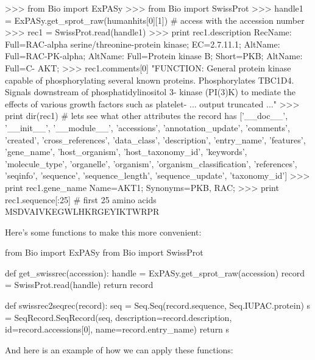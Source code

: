 \begin{python}
>>> from Bio import ExPASy
>>> from Bio import SwissProt
>>> handle1 = ExPASy.get_sprot_raw(humanhits[0][1]) # access with the accession number
>>> rec1 = SwissProt.read(handle1)
>>> print rec1.description
RecName: Full=RAC-alpha serine/threonine-protein kinase; EC=2.7.11.1; AltName: 
Full=RAC-PK-alpha; AltName: Full=Protein kinase B; Short=PKB; AltName: Full=C-
AKT;
>>> rec1.comments[0]
"FUNCTION: General protein kinase capable of phosphorylating several known 
proteins. Phosphorylates TBC1D4. Signals downstream of phosphatidylinositol 3-
kinase (PI(3)K) to mediate the effects of various growth factors such as platelet-
... output truncated ..."
>>> print dir(rec1) # lets see what other attributes the record has
['__doc__', '__init__', '__module__', 'accessions', 'annotation_update', 'comments', 'created', 'cross_references', 'data_class', 'description', 'entry_name', 'features', 'gene_name', 'host_organism', 'host_taxonomy_id', 'keywords', 'molecule_type', 'organelle', 'organism', 'organism_classification', 'references', 'seqinfo', 'sequence', 'sequence_length', 'sequence_update', 'taxonomy_id']
>>> print rec1.gene_name
Name=AKT1; Synonyms=PKB, RAC;
>>> print rec1.sequence[:25] # first 25 amino acids
MSDVAIVKEGWLHKRGEYIKTWRPR
\end{python}

Here's some functions to make this more convenient:

\begin{python}
from Bio import ExPASy
from Bio import SwissProt

def get_swissrec(accession):
    handle = ExPASy.get_sprot_raw(accession)
    record = SwissProt.read(handle)
    return record
    
def swissrec2seqrec(record):
    seq = Seq.Seq(record.sequence, Seq.IUPAC.protein)
    s = SeqRecord.SeqRecord(seq, description=record.description, 
                id=record.accessions[0], name=record.entry_name)
    return s        
\end{python}
%
And here is an example of how we can apply these functions:

